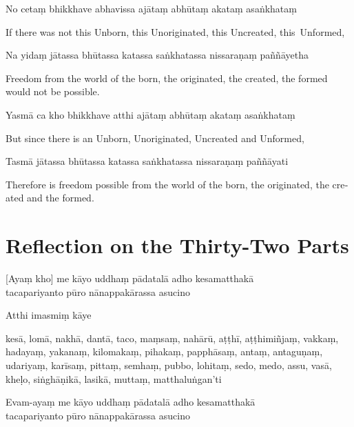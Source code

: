 No cetaṃ bhikkhave abhavissa ajātaṃ abhūtaṃ akataṃ asaṅkhataṃ

\begin{english}
  If there was not this Unborn, this Unoriginated, this Uncreated, this~Unformed,
\end{english}

Na yidaṃ jātassa bhūtassa katassa saṅkhatassa nissaraṇaṃ paññāyetha

\begin{english}
  Freedom from the world of the born, the originated, the created, the formed would not be possible.
\end{english}

Yasmā ca kho bhikkhave atthi ajātaṃ abhūtaṃ akataṃ asaṅkhataṃ

\begin{english}
  But since there is an Unborn, Unoriginated, Uncreated and Unformed,
\end{english}

Tasmā jātassa bhūtassa katassa saṅkhatassa nissaraṇaṃ paññāyati

\begin{english}
  Therefore is freedom possible from the world of the born, the originated, the created and the formed.
\end{english}


\section{Reflection on the Thirty-Two Parts}

\begin{leader}
\end{leader}


[Ayaṃ kho] me kāyo uddhaṃ pādatalā adho kesamatthakā\\
tacapariyanto pūro nānappakārassa asucino

Atthi imasmiṃ kāye

kesā, lomā, nakhā, dantā, taco, maṃsaṃ, nahārū, aṭṭhī, aṭṭhimiñjaṃ, vakkaṃ, hadayaṃ, yakanaṃ, kilomakaṃ, pihakaṃ, papphāsaṃ, antaṃ, antaguṇaṃ, udariyaṃ, karīsaṃ, pittaṃ, semhaṃ, pubbo, lohitaṃ, sedo, medo, assu, vasā, kheḷo, siṅghāṇikā, lasikā, muttaṃ, matthaluṅgan'ti

Evam-ayaṃ me kāyo uddhaṃ pādatalā adho kesamatthakā\\
tacapariyanto pūro nānappakārassa asucino\\

